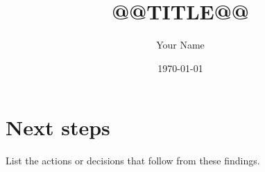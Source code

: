 \documentclass[11pt,letterpaper]{article}
\title{@@TITLE@@}
\author{Your Name}
\date{\today}
\begin{document}
\maketitle

\section*{Next steps}
List the actions or decisions that follow from these findings.
\end{document}
